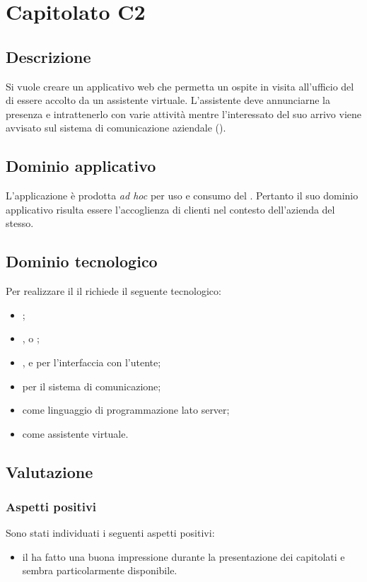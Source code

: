 \documentclass[../StudioDiFattibilita.tex]{subfiles}
\begin{document}
	\section{Capitolato C2}
		\subsection{Descrizione}
		Si vuole creare un applicativo web che permetta un ospite in visita all'ufficio del  di essere accolto da un assistente virtuale. L'assistente deve annunciarne la presenza e intrattenerlo con varie attività mentre l'interessato del suo arrivo viene avvisato sul sistema di comunicazione aziendale ().
		\subsection{Dominio applicativo}
			L'applicazione è prodotta \textit{ad hoc} per uso e consumo del . Pertanto il suo dominio applicativo risulta essere l'accoglienza di clienti nel contesto dell'azienda del  stesso.
		\subsection{Dominio tecnologico}
			Per realizzare il  il  richiede il seguente  tecnologico:
		\begin{itemize}
			\item \textbf{}; 
			\item \textbf{}, \textbf{} o \textbf{};
			\item \textbf{}, \textbf{} e \textbf{} per l'interfaccia con l'utente;
			\item \textbf{} per il sistema di comunicazione;
			\item \textbf{} \textbf{} come linguaggio di programmazione lato server;
			\item \textbf{} \textbf{} come assistente virtuale.
		\end{itemize}
		\subsection{Valutazione}
			\subsubsection{Aspetti positivi}
			Sono stati individuati i seguenti aspetti positivi:
			\begin{itemize}
				\item il  ha fatto una buona impressione durante la presentazione dei capitolati e sembra particolarmente disponibile.
			\end{itemize}
\end{document}
